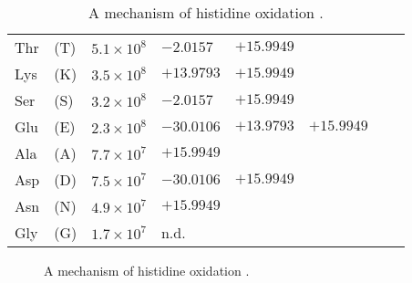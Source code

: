 \begin{table}
{\begin{tabular}{ l l l l l l l l }
  Thr&(T)    & \(5.1 \times 10^8 \)          & \( -2.0157\) & \(+15.9949\) & & & \\ 
  Lys&(K)    & \(3.5 \times 10^8 \)          & \(+13.9793\) & \(+15.9949\) & & & \\ 
  Ser&(S)    & \(3.2 \times 10^8 \)          & \( -2.0157\) & \(+15.9949\) & & & \\ 
  Glu&(E)    & \(2.3 \times 10^8 \)          & \(-30.0106\) & \(+13.9793\) & \(+15.9949\) & & \\ 
  Ala&(A)    & \(7.7 \times 10^7 \)          & \(+15.9949\) & & & & \\ 
  Asp&(D)    & \(7.5 \times 10^7 \)          & \(-30.0106\) & \(+15.9949\) & & & \\ 
  Asn&(N)    & \(4.9 \times 10^7 \)          & \(+15.9949\) & & & & \\ 
  Gly&(G)    & \(1.7 \times 10^7 \)          & n.d. & & & & \\ \bottomrule
  \end{tabular}}
\caption[
	The initial rates of the second-order reaction of free amino acids with \gls{OH-rad} at pH=7 
			and the common mass shifts produced by such reaction.]{
	The initial rates of the second-order reaction of free amino acids with \gls{OH-rad} at pH=7 
			and the common mass shifts produced by such reaction.
	A free molecule is not covalently bound to any other molecule. 
	If an amino acid residue is part of a given protein in a given solution, 
		then the \(\text{k}_{\gls{OH-rad}}\) of this residue depends on 
			the position of this residue with respect to this given protein and on the properties of this given solution.
	\label{tab:AA-OH-reaction-rate}}

\begin{figure}[H]
\center
{}
\caption[
	A mechanism of histidine oxidation \cite{lee2006perr}.]{
	A mechanism of histidine oxidation \cite{lee2006perr}.
	\label{OH_Leu_example}}
\end{figure}
\end{table}	

